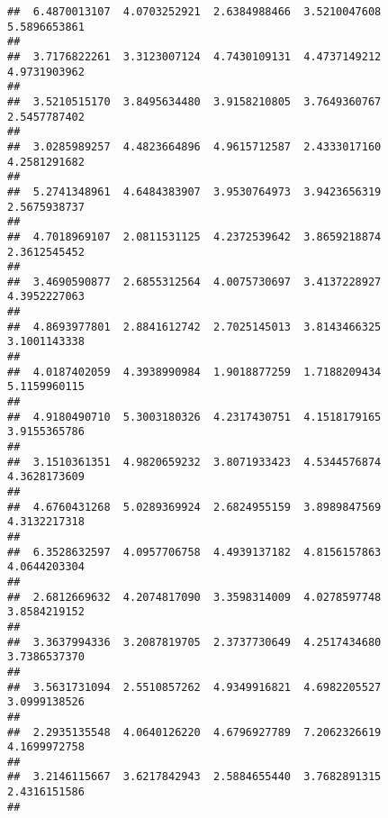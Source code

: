 \documentclass[]{article}
\begin{document}
\begin{verbatim}
##  6.4870013107  4.0703252921  2.6384988466  3.5210047608  5.5896653861 
##                                                                       
##  3.7176822261  3.3123007124  4.7430109131  4.4737149212  4.9731903962 
##                                                                       
##  3.5210515170  3.8495634480  3.9158210805  3.7649360767  2.5457787402 
##                                                                       
##  3.0285989257  4.4823664896  4.9615712587  2.4333017160  4.2581291682 
##                                                                       
##  5.2741348961  4.6484383907  3.9530764973  3.9423656319  2.5675938737 
##                                                                       
##  4.7018969107  2.0811531125  4.2372539642  3.8659218874  2.3612545452 
##                                                                       
##  3.4690590877  2.6855312564  4.0075730697  3.4137228927  4.3952227063 
##                                                                       
##  4.8693977801  2.8841612742  2.7025145013  3.8143466325  3.1001143338 
##                                                                       
##  4.0187402059  4.3938990984  1.9018877259  1.7188209434  5.1159960115 
##                                                                       
##  4.9180490710  5.3003180326  4.2317430751  4.1518179165  3.9155365786 
##                                                                       
##  3.1510361351  4.9820659232  3.8071933423  4.5344576874  4.3628173609 
##                                                                       
##  4.6760431268  5.0289369924  2.6824955159  3.8989847569  4.3132217318 
##                                                                       
##  6.3528632597  4.0957706758  4.4939137182  4.8156157863  4.0644203304 
##                                                                       
##  2.6812669632  4.2074817090  3.3598314009  4.0278597748  3.8584219152 
##                                                                       
##  3.3637994336  3.2087819705  2.3737730649  4.2517434680  3.7386537370 
##                                                                       
##  3.5631731094  2.5510857262  4.9349916821  4.6982205527  3.0999138526 
##                                                                       
##  2.2935135548  4.0640126220  4.6796927789  7.2062326619  4.1699972758 
##                                                                       
##  3.2146115667  3.6217842943  2.5884655440  3.7682891315  2.4316151586 
##                                                                       

\end{verbatim}
\end{document}
